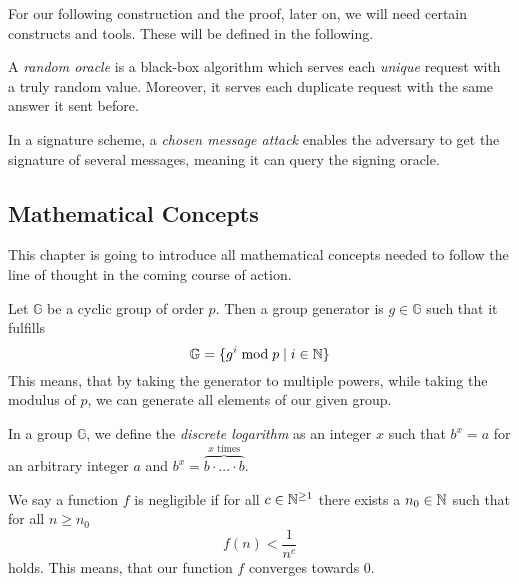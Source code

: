 For our following construction and the proof, later on, we will need certain constructs and tools.
These will be defined in the following.

\begin{definition}
  A \textit{random oracle} is a black-box algorithm which serves each \textit{unique} request with a truly random value. Moreover, it serves each duplicate request with the same answer it sent before.
\end{definition}

\begin{definition}
  In a signature scheme, a \textit{chosen message attack} enables the adversary to get the signature of several messages, meaning it can query the signing oracle.
\end{definition}

\subsection{Mathematical Concepts}
  This chapter is going to introduce all mathematical concepts needed to follow the line of thought in the coming course of action. 
  
  \begin{definition}
    Let \(\mathbb{G}\) be a cyclic group of order \(p\). Then a group generator is \(g\in\mathbb{G}\) such that it fulfills
      \[\mathbb{G} =  \{ g^i \bmod p \mid i\in\mathbb{N} \}\]
    This means, that by taking the generator to multiple powers, while taking the modulus of \(p\), we can generate all elements of our given group.
  \end{definition}

  \begin{definition}
    In a group \(\mathbb{G}\), we define the \textit{discrete logarithm} as an integer \(x\) such that \(b^x = a\) for an arbitrary integer \(a\) and \(b^x = \overbrace{b\cdot \ldots\cdot b}^{x \text{ times}}\).
  \end{definition}

  \begin{definition}
    We say a function \(f\) is negligible if for all \(c\in\mathbb{N}^{\geq 1}\) there exists a \(n_0\in\mathbb{N}\) such that for all \(n \geq n_0\)
    \[f(n) < \frac{1}{n^c}\]
    holds. This means, that our function \(f\) converges towards 0. 
  \end{definition}


